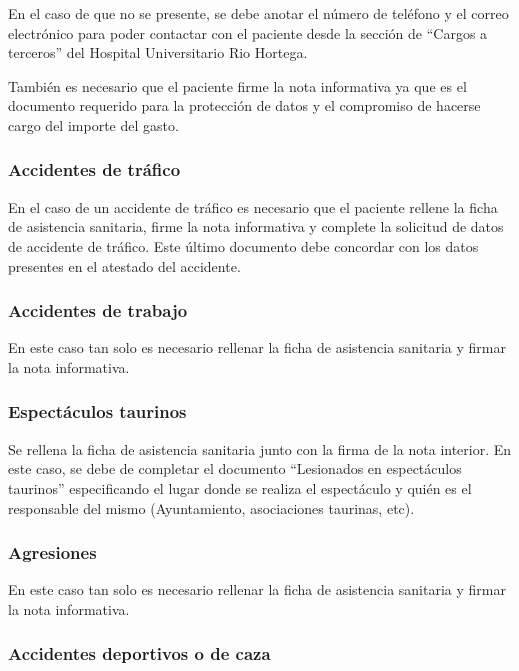 En el caso de que no se presente, se debe anotar el número de teléfono y el correo electrónico para poder contactar con el paciente desde la sección de ``Cargos a terceros'' del Hospital Universitario Rio Hortega.

También es necesario que el paciente firme la nota informativa ya que es el documento requerido para la protección de datos y el compromiso de hacerse cargo del importe del gasto.

\subsubsection{Accidentes de tráfico}

En el caso de un accidente de tráfico es necesario que el paciente rellene la ficha de asistencia sanitaria, firme la nota informativa y complete la solicitud de datos de accidente de tráfico.
Este último documento debe concordar con los datos presentes en el atestado del accidente.

\subsubsection{Accidentes de trabajo}

En este caso tan solo es necesario rellenar la ficha de asistencia sanitaria y firmar la nota informativa.

\subsubsection{Espectáculos taurinos}

Se rellena la ficha de asistencia sanitaria junto con la firma de la nota interior.
En este caso, se debe de completar el documento ``Lesionados en espectáculos taurinos'' especificando el lugar donde se realiza el espectáculo y quién es el responsable del mismo (Ayuntamiento, asociaciones taurinas, etc).

\subsubsection{Agresiones}

En este caso tan solo es necesario rellenar la ficha de asistencia sanitaria y firmar la nota informativa.

\subsubsection{Accidentes deportivos o de caza}

